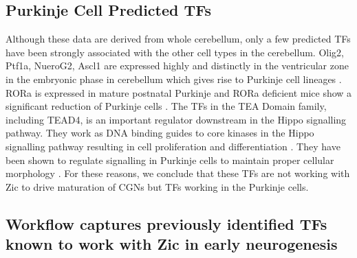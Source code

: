 \documentclass[fleqn,10pt,twocolumn]{wlscirep}
\begin{document}
\subsection*{Purkinje Cell Predicted TFs}
Although these data are derived from whole cerebellum, only a few predicted TFs have been strongly associated with the other cell types in the cerebellum. Olig2, Ptf1a, NueroG2, Ascl1 are expressed highly and distinctly in the ventricular zone in the embryonic phase in cerebellum which gives rise to Purkinje cell lineages \cite{Lowenstein2021Olig3Development}. RORa is expressed in mature postnatal Purkinje and RORa deficient mice show a significant reduction of Purkinje cells \cite{Jetten2006RetinoidrelatedDevelopment}. The TFs in the TEA Domain family, including TEAD4, is an important regulator downstream in the Hippo signalling pathway. They work as DNA binding guides to core kinases in the Hippo signalling pathway resulting in cell proliferation and differentiation  \cite{Lavado2018TheNumber, Jin2020TheDiseases}. They have been shown to regulate signalling in Purkinje cells to maintain proper cellular morphology \cite{Jin2020TheDiseases}. For these reasons, we conclude that these TFs are not working with Zic to drive maturation of CGNs but TFs working in the Purkinje cells.



\subsection*{Workflow captures previously identified TFs known to work with Zic in early neurogenesis}

\end{document}
